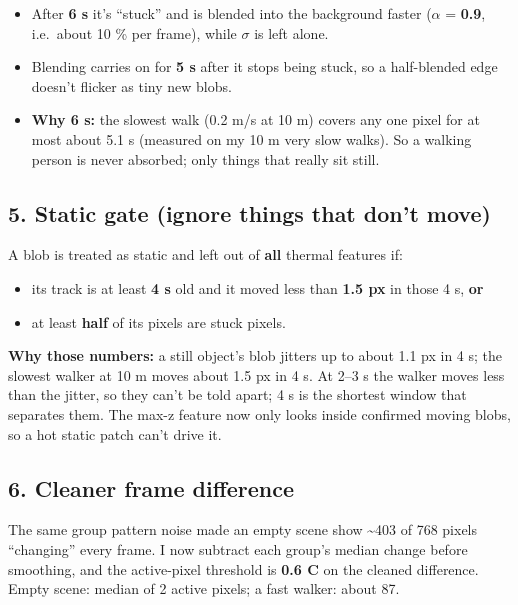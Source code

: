 \documentclass[11pt,a4paper]{article}
\providecommand{\tightlist}{\setlength{\itemsep}{0pt}\setlength{\parskip}{0pt}}
\begin{document}
\begin{itemize}
\tightlist
\item
  After \textbf{6 s} it's
  ``stuck'' and is blended
  into the background faster
  ($\alpha$ = \textbf{0.9},
  i.e.~about 10 \% per frame),
  while $\sigma$ is left alone.
\item
  Blending carries on for
  \textbf{5 s} after it stops
  being stuck, so a
  half-blended edge doesn't
  flicker as tiny new blobs.
\item
  \textbf{Why 6 s:} the
  slowest walk (0.2 m/s at 10
  m) covers any one pixel for
  at most about 5.1 s
  (measured on my 10 m very
  slow walks). So a walking
  person is never absorbed;
  only things that really sit
  still.
\end{itemize}

\hypertarget{static-gate-ignore-things-that-dont-move}{%
\subsection{5. Static gate
(ignore things that don't
move)}\label{static-gate-ignore-things-that-dont-move}}

A blob is treated as static
and left out of \textbf{all}
thermal features if:

\begin{itemize}
\tightlist
\item
  its track is at least
  \textbf{4 s} old and it
  moved less than \textbf{1.5
  px} in those 4 s,
  \textbf{or}
\item
  at least \textbf{half} of
  its pixels are stuck pixels.
\end{itemize}

\textbf{Why those numbers:} a
still object's blob jitters up
to about 1.1 px in 4 s; the
slowest walker at 10 m moves
about 1.5 px in 4 s. At 2--3 s
the walker moves less than the
jitter, so they can't be told
apart; 4 s is the shortest
window that separates them.
The max-z feature now only
looks inside confirmed moving
blobs, so a hot static patch
can't drive it.

\hypertarget{cleaner-frame-difference}{%
\subsection{6. Cleaner frame
difference}\label{cleaner-frame-difference}}

The same group pattern noise
made an empty scene show
\textasciitilde403 of 768
pixels ``changing'' every
frame. I now subtract each
group's median change before
smoothing, and the
active-pixel threshold is
\textbf{0.6 \textdegree{}C} on the cleaned
difference. Empty scene:
median of 2 active pixels; a
fast walker: about 87.
\end{document}
